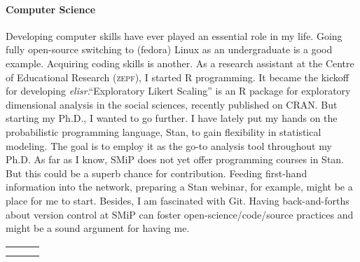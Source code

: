 \documentclass[11pt]{FreemanML}
\begin{document}
\paragraph{Computer Science}

Developing computer skills have ever played an essential role in my life. Going
fully open-source switching to (fedora) Linux as an undergraduate is a good
example. Acquiring coding skills is another. As a research assistant at the
Centre of Educational Research (\textsc{zepf}), I started R programming. It
became the kickoff for developing \textit{elisr}.\enquote{Exploratory Likert
Scaling} is an R package for exploratory dimensional analysis in the social
sciences, recently published on CRAN. But starting my Ph.D., I wanted to go
further. I have lately put my hands on the probabilistic programming language,
Stan, to gain flexibility in statistical modeling. The goal is to employ it as
the go-to analysis tool throughout my Ph.D. As far as I know, SMiP does not yet
offer programming courses in Stan. But this could be a superb chance for
contribution. Feeding first-hand information into the network,  preparing a
Stan webinar, for example, might be a place for me to start. Besides, I am
fascinated with Git. Having back-and-forths about version control at SMiP can
foster open-science/code/source practices and might be a sound argument for
having me.


\vfill
\begin{tabular}{p{8cm}p{.5cm}l}
\dotfill \\ 
\centering{Steven Bißantz} 
\end{tabular}%
\vfill

\end{document}
